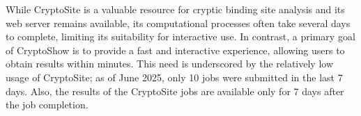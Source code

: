 While CryptoSite is a valuable resource for cryptic binding site analysis and its web server remains available, its computational processes often take several days to complete, limiting its suitability for interactive use. In contrast, a primary goal of CryptoShow is to provide a fast and interactive experience, allowing users to obtain results within minutes. This need is underscored by the relatively low usage of CryptoSite; as of June 2025, only 10 jobs were submitted in the last 7 days. Also, the results of the CryptoSite jobs are available only for 7 days after the job completion.

